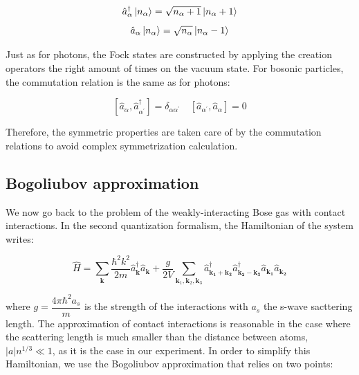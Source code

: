 \begin{equation}
    \hat{a}_{\alpha}^{\dagger} \ket{n_{\alpha}}=\sqrt{n_{\alpha}+1}\left|n_{\alpha}+1\right\rangle
\end{equation}
\begin{equation}
    \hat{a}_{\alpha} \ket{n_{\alpha}}=\sqrt{n_{\alpha}}\left|n_{\alpha}-1\right\rangle
\end{equation}

Just as for photons, the Fock states are constructed by applying the creation operators the right amount of times on the vacuum state. For bosonic particles, the commutation relation is the same as for photons:

\begin{equation}
    \left[\hat{a}_{\alpha}, \hat{a}_{\alpha^{\prime}}^{\dagger}\right]=\delta_{\alpha \alpha^{\prime}} \quad\left[\hat{a}_{\alpha^{\prime}}, \hat{a}_{\alpha}\right]=0
\end{equation}

\noindent Therefore, the symmetric properties are taken care of by the commutation relations to avoid complex symmetrization calculation. 


\subsection{Bogoliubov approximation}


We now go back to the problem of the weakly-interacting Bose gas with contact interactions. In the second quantization formalism, the Hamiltonian of the system writes:

\begin{equation}
    \hat{H}=\sum_{\bm{k}}\frac{\hbar^2 k^2}{2m} \hat{a}^{\dagger}_{\bm{k}}  \hat{a}_{\bm{k}} +  \frac{g}{2V} \sum_{\bm{k}_1,\bm{k}_2,\bm{k}_3} \hat{a}^{\dagger}_{\bm{k_1}+\bm{k_3}} \hat{a}^{\dagger}_{\bm{k_2}-\bm{k_3}} \hat{a}_{\bm{k_1}} \hat{a}_{\bm{k_2}} 
\end{equation}

\noindent where $g=\dfrac{4 \pi \hbar^2 a_s}{m}$ is the strength of the interactions with $a_s$ the s-wave sacttering length. The approximation of contact interactions is reasonable in the case where the scattering length is much smaller than the distance between atoms, $|a| n^{1/3} \ll 1$, as it is the case in our experiment. In order to simplify this Hamiltonian, we use the Bogoliubov approximation that relies on two points:

